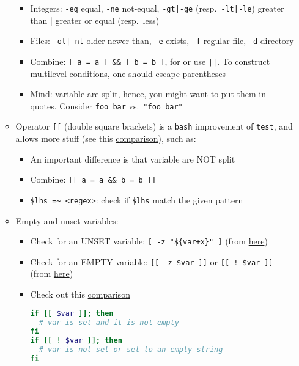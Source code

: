 \documentclass[a4paper,12pt,%
              final%
              ]{article}
\begin{document}
\begin{itemize}
\begin{itemize}
\begin{itemize}
          \item Integers: \verb|-eq| equal, \verb|-ne| not-equal, \verb!-gt|-ge! (resp.\ \verb!-lt|-le!) greater than | greater or equal (resp.\ less)
          \item Files: \verb!-ot|-nt! older|newer than, \verb|-e| exists, \verb|-f| regular file, \verb|-d| directory
          \item Combine: \verb|[ a = a ] && [ b = b ]|, for or use \verb!||!. To construct multilevel conditions, one should escape parentheses
          \item Mind: variable are split, hence, you might want to put them in quotes. Consider \verb|foo bar| vs.\ \verb|"foo bar"|
        \end{itemize}
      \item Operator \verb|[[| (double square brackets) is a \texttt{bash} improvement of \texttt{test}, and allows more stuff (see this \href{https://stackoverflow.com/a/47576482}{comparison}), such as:
        \begin{itemize}
          \item An important difference is that variable are NOT split
          \item Combine: \verb|[[ a = a && b = b ]]|
          \item \verb|$lhs =~ <regex>|: check if \verb|$lhs| match the given pattern
        \end{itemize}
      \item Empty and unset variables:
        \begin{itemize}
          \item Check for an UNSET variable: \verb|[ -z "${var+x}" ]| (from \href{https://stackoverflow.com/questions/3601515/how-to-check-if-a-variable-is-set-in-bash}{here})
          \item Check for an EMPTY variable: \verb|[[ -z $var ]]| or \verb|[[ ! $var ]]| (from \href{https://serverfault.com/questions/7503/how-to-determine-if-a-bash-variable-is-empty}{here})
          \item Check out this \href{https://stackoverflow.com/questions/3869072/test-for-non-zero-length-string-in-bash-n-var-or-var}{comparison}
\begin{lstlisting}[language=bash]
if [[ $var ]]; then
  # var is set and it is not empty
fi
if [[ ! $var ]]; then
  # var is not set or set to an empty string
fi
\end{lstlisting}
        \end{itemize}
    \end{itemize}

\end{itemize}
\end{document}
